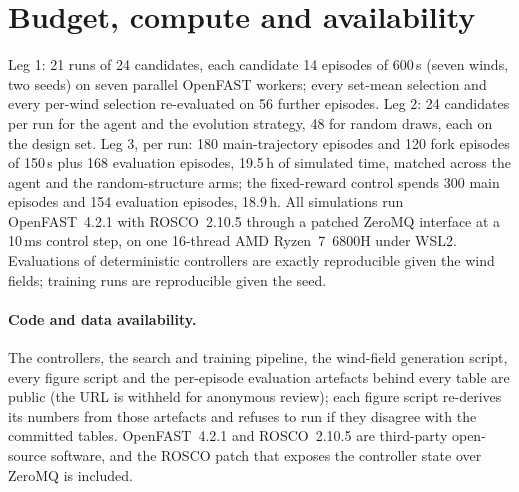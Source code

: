 \documentclass{article}
\newcommand{\repourl}{the URL is withheld for anonymous review}%
\begin{document}
\section{Budget, compute and availability}
\label{app:compute}
Leg 1: 21 runs of 24 candidates, each candidate 14 episodes of 600\,s (seven winds, two seeds) on seven parallel OpenFAST workers; every set-mean selection and every per-wind selection re-evaluated on 56 further episodes. Leg 2: 24 candidates per run for the agent and the evolution strategy, 48 for random draws, each on the design set. Leg 3, per run: 180 main-trajectory episodes and 120 fork episodes of 150\,s plus 168 evaluation episodes, 19.5\,h of simulated time, matched across the agent and the random-structure arms; the fixed-reward control spends 300 main episodes and 154 evaluation episodes, 18.9\,h. All simulations run OpenFAST~4.2.1 with ROSCO~2.10.5 through a patched ZeroMQ interface at a 10\,ms control step, on one 16-thread AMD Ryzen~7~6800H under WSL2. Evaluations of deterministic controllers are exactly reproducible given the wind fields; training runs are reproducible given the seed.

\paragraph{Code and data availability.} The controllers, the search and training pipeline, the wind-field generation script, every figure script and the per-episode evaluation artefacts behind every table are public (\repourl); each figure script re-derives its numbers from those artefacts and refuses to run if they disagree with the committed tables. OpenFAST~4.2.1 and ROSCO~2.10.5 are third-party open-source software, and the ROSCO patch that exposes the controller state over ZeroMQ is included.
\end{document}
